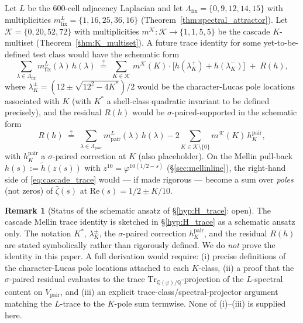\documentclass[11pt, a4paper]{amsart}
\theoremstyle{definition}
\newtheorem{remark}[theorem]{Remark}
\newcommand{\Q}{\mathbb{Q}}
\begin{document}
Let $L$ be the 600-cell adjacency Laplacian and let
$\Lambda_{\mathrm{fix}} = \{0,9,12,14,15\}$ with multiplicities
$m^L_{\mathrm{fix}} = \{1,16,25,36,16\}$ (Theorem~\ref{thm:spectral_attractor}).
Let $\mathcal{K} = \{0,20,52,72\}$ with multiplicities
$m^{\mathcal K} : \mathcal{K} \to \{1,1,5,5\}$ be the cascade
$K$-multiset (Theorem~\ref{thm:K_multiset}).  A future trace
identity for some yet-to-be-defined test class would have the
schematic form
\begin{equation}
\label{eq:cascade_trace}
\sum_{\lambda\in\Lambda_{\mathrm{fix}}}
   m^L_{\mathrm{fix}}(\lambda)\, h(\lambda)
\;\stackrel{?}{=}\;
\sum_{K \in \mathcal{K}}\, m^{\mathcal K}(K) \cdot
   \bigl[ h(\lambda^+_K) + h(\lambda^-_K) \bigr]
\;+\; R(h),
\end{equation}
where $\lambda^\pm_K = (12 \pm \sqrt{12^2 - 4 K^*})/2$ would be the
character-Lucas pole locations associated with $K$ (with $K^*$ a
shell-class quadratic invariant to be defined precisely), and the
residual $R(h)$ would be $\sigma$-paired-supported in the
schematic form
\[
R(h) \;\stackrel{?}{=}\; \sum_{\lambda\in\Lambda_{\mathrm{pair}}}
   m^L_{\mathrm{pair}}(\lambda)\, h(\lambda)
   - 2\sum_{K \in \mathcal{K}\setminus\{0\}} m^{\mathcal K}(K)\,
       h^{\mathrm{pair}}_K,
\]
with $h^{\mathrm{pair}}_K$ a $\sigma$-paired correction at $K$
(also placeholder).  On the Mellin pull-back
$h(s) := \tilde h(z(s))$ with $z^{10} = \varphi^{10(1/2-s)}$
(\S\ref{sec:mellinline}), the right-hand side of
\eqref{eq:cascade_trace} would --- if made rigorous --- become a
sum over \emph{poles} (not zeros) of $\widehat\zeta(s)$ at
$\mathrm{Re}(s) = 1/2 \pm K/10$.

\begin{remark}[Status of the schematic ansatz of \S\ref{hyp:H_trace}: open]\label{rmk:trace_status}
The cascade Mellin trace identity is sketched in
\S\ref{hyp:H_trace} as a schematic ansatz only.  The notation $K^*$, $\lambda^\pm_K$, the
$\sigma$-paired correction $h^{\mathrm{pair}}_K$, and the residual
$R(h)$ are stated symbolically rather than rigorously defined.  We
do \emph{not} prove the identity in this paper.  A full derivation
would require: (i) precise definitions of the character-Lucas pole
locations attached to each $K$-class, (ii) a proof that the
$\sigma$-paired residual evaluates to the trace
$\mathrm{Tr}_{\Q(\varphi)/\Q}$-projection of the $L$-spectral
content on $V_{\mathrm{pair}}$, and (iii) an explicit
trace-class/spectral-projector argument matching the $L$-trace to
the $K$-pole sum termwise.  None of (i)--(iii) is supplied here.
\end{remark}
\end{document}
